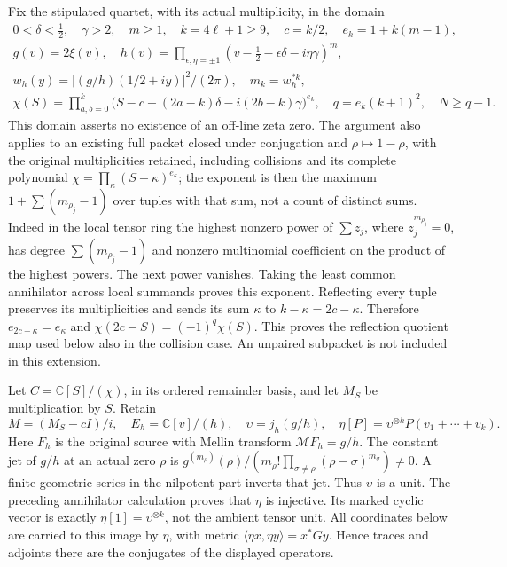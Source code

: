 \documentclass[11pt]{article}
\newcommand{\C}{\mathbb C}\newcommand{\R}{\mathbb R}
\begin{document}
Fix the stipulated quartet, with its actual multiplicity, in the domain
\begin{equation}\tag{HR1}\label{HR1}
\begin{gathered}
0<\delta<\tfrac12,\quad\gamma>2,\quad m\ge1,\quad
k=4\ell+1\ge9,\quad c=k/2,\quad e_k=1+k(m-1),\\
g(v)=2\xi(v),\quad h(v)=\prod_{\epsilon,\eta=\pm1}
(v-\tfrac12-\epsilon\delta-i\eta\gamma)^m,\\
w_h(y)=|(g/h)(1/2+iy)|^2/(2\pi),\quad m_k=w_h^{*k},\\
\chi(S)=\prod_{a,b=0}^k
\bigl(S-c-(2a-k)\delta-i(2b-k)\gamma\bigr)^{e_k},\quad
q=e_k(k+1)^2,\quad N\ge q-1.
\end{gathered}
\end{equation}
This domain asserts no existence of an off-line zeta zero. The argument
also applies to an existing full packet closed under conjugation and
\(\rho\mapsto1-\rho\), with the original multiplicities retained,
including collisions and its complete polynomial
\(\chi=\prod_\kappa(S-\kappa)^{e_\kappa}\); the exponent is then the
maximum \(1+\sum(m_{\rho_j}-1)\) over tuples with that sum, not a count
of distinct sums. Indeed in the local tensor ring the highest nonzero
power of \(\sum z_j\), where \(z_j^{m_{\rho_j}}=0\), has degree
\(\sum(m_{\rho_j}-1)\) and nonzero multinomial coefficient on the
product of the highest powers. The next power vanishes. Taking the
least common annihilator across local summands proves this exponent.
Reflecting every tuple preserves its multiplicities and sends its sum
\(\kappa\) to \(k-\kappa=2c-\kappa\). Therefore
\(e_{2c-\kappa}=e_\kappa\) and
\(\chi(2c-S)=(-1)^q\chi(S)\). This proves the reflection quotient
map used below also in the collision case. An unpaired subpacket is
not included in this extension.

Let \(C=\C[S]/(\chi)\), in its ordered remainder basis, and let
\(M_S\) be multiplication by \(S\). Retain
\begin{equation}\tag{HR2}\label{HR2}
M=(M_S-cI)/i,\quad E_h=\C[v]/(h),\quad
\upsilon=j_h(g/h),\quad
\eta[P]=\upsilon^{\otimes k}P(v_1+\cdots+v_k).
\end{equation}
Here \(F_h\) is the original source with Mellin transform
\(\mathcal M F_h=g/h\). The constant jet of \(g/h\) at an actual zero \(\rho\) is
\(g^{(m_\rho)}(\rho)/(m_\rho!\prod_{\sigma\ne\rho}
(\rho-\sigma)^{m_\sigma})\ne0\). A finite geometric series in the
nilpotent part inverts that jet. Thus \(\upsilon\) is a unit.
The preceding annihilator calculation proves that \(\eta\) is
injective. Its marked cyclic vector is exactly
\(\eta[1]=\upsilon^{\otimes k}\), not the ambient tensor unit.
All coordinates below are carried to this image by \(\eta\), with
metric \(\langle\eta x,\eta y\rangle=x^*Gy\). Hence traces and
adjoints there are the conjugates of the displayed operators.
\end{document}
